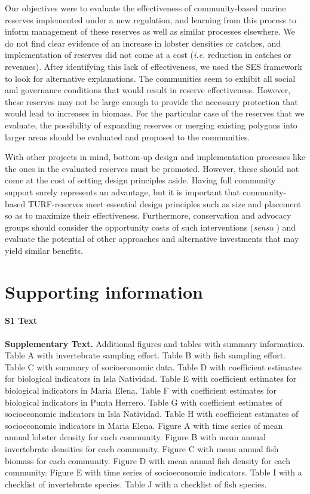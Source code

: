 \documentclass[10pt,letterpaper]{article}
\begin{document}
Our objectives were to evaluate the effectiveness of community-based marine reserves implemented under a new regulation, and learning from this process to inform management of these reserves as well as similar processes elsewhere. We do not find clear evidence of an increase in lobster densities or catches, and implementation of reserves did not come at a cost (\emph{i.e.} reduction in catches or revenues). After identifying this lack of effectiveness, we used the SES framework to look for alternative explanations. The communities seem to exhibit all social and governance conditions that would result in reserve effectiveness. However, these reserves may not be large enough to provide the necessary protection that would lead to increases in biomass. For the particular case of the reserves that we evaluate, the possibility of expanding reserves or merging existing polygons into larger areas should be evaluated and proposed to the communities.

With other projects in mind, bottom-up design and implementation processes like the ones in the evaluated reserves must be promoted. However, these should not come at the cost of setting design principles aside. Having full community support surely represents an advantage, but it is important that community-based TURF-reserves meet essential design principles such as size and placement so as to maximize their effectiveness. Furthermore, conservation and advocacy groups should consider the opportunity costs of such interventions (\emph{sensu} \cite{smith_2010}) and evaluate the potential of other approaches and alternative investments that may yield similar benefits.

\section*{Supporting information}

\paragraph*{S1 Text}
\label{S1_Text}
{\bf Supplementary Text.} Additional figures and tables with summary information. Table A with invertebrate sampling effort. Table B with fish sampling effort. Table C with summary of socioeconomic data. Table D with coefficient estimates for biological indicators in Isla Natividad. Table E with coefficient estimates for biological indicators in Maria Elena. Table F with coefficient estimates for biological indicators in Punta Herrero. Table G with coefficient estimates of socioeconomic indicators in Isla Natividad. Table H with coefficient estimates of socioeconomic indicators in Maria Elena. Figure A with time series of mean annual lobster density for each community. Figure B with mean annual invertebrate densities for each community. Figure C with mean annual fish biomass for each community. Figure D with mean annual fish density for each community. Figure E with time series of socioeconomic indicators. Table I with a checklist of invertebrate species. Table J with a checklist of fish species.
\end{document}
